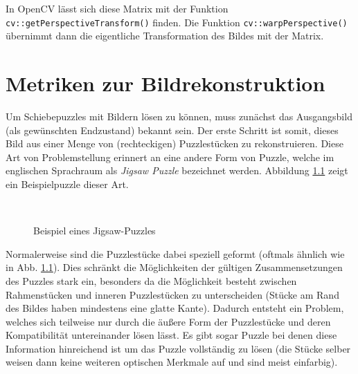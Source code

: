 \documentclass{whswinvcbook}
\begin{document}
In OpenCV lässt sich diese Matrix mit der Funktion \texttt{cv::getPerspectiveTransform()} finden. Die Funktion \texttt{cv::warpPerspective()} übernimmt dann die eigentliche Transformation des Bildes mit der Matrix.
\chapter{Metriken zur Bildrekonstruktion}
Um Schiebepuzzles mit Bildern lösen zu können, muss zunächst das Ausgangsbild (als gewünschten Endzustand) bekannt sein. Der erste Schritt ist somit, dieses Bild aus einer Menge von (rechteckigen) Puzzlestücken zu rekonstruieren. Diese Art von Problemstellung erinnert an eine andere Form von Puzzle, welche im englischen Sprachraum als \textit{Jigsaw Puzzle} bezeichnet werden. Abbildung \ref{fig-jig-ex} zeigt ein Beispielpuzzle dieser Art.
\begin{figure}[H]
    \centering
    \\
    \quad
    \caption{Beispiel eines Jigsaw-Puzzles}
    \label{fig-jig-ex}
\end{figure}
Normalerweise sind die Puzzlestücke dabei speziell geformt (oftmals ähnlich wie in Abb. \ref{fig-jig-ex}). Dies schränkt die Möglichkeiten der gültigen Zusammensetzungen des Puzzles stark ein, besonders da die Möglichkeit besteht zwischen Rahmenstücken und inneren Puzzlestücken zu unterscheiden (Stücke am Rand des Bildes haben mindestens eine glatte Kante). Dadurch entsteht ein Problem, welches sich teilweise nur durch die äußere Form der Puzzlestücke und deren Kompatibilität untereinander lösen lässt. Es gibt sogar Puzzle bei denen diese Information hinreichend ist um das Puzzle vollständig zu lösen (die Stücke selber weisen dann keine weiteren optischen Merkmale auf und sind meist einfarbig).
\end{document}
